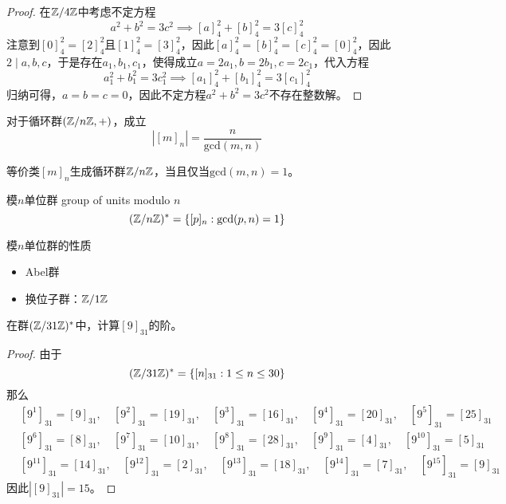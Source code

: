 \begin{proof}
	在$\mathbb{Z}/4\mathbb{Z}$中考虑不定方程
	$$
	a^2+b^2=3c^2\implies [a]^2_4+[b]^2_4=3[c]^2_4
	$$
	注意到$[0]_4^2=[2]^2_4$且$[1]_4^2=[3]^2_4$，因此$[a]_4^2=[b]_4^2=[c]_4^2=[0]_4^2$，因此$2\mid a,b,c$，于是存在$a_1,b_1,c_1$，使得成立$a=2a_1,b=2b_1,c=2c_1$，代入方程
	$$
	a_1^2+b_1^2=3c_1^2\implies [a_1]^2_4+[b_1]^2_4=3[c_1]^2_4
	$$
	归纳可得，$a=b=c=0$，因此不定方程$a^2+b^2=3c^2$不存在整数解。
\end{proof}

\begin{proposition}
	对于循环群$(\mathbb{Z}/n\mathbb{Z},+)$，成立
	$$
	|[m]_n|=\frac{n}{\mathrm{gcd}(m,n)}
	$$
\end{proposition}

\begin{corollary}
	等价类$[m]_n$生成循环群$\mathbb{Z}/n\mathbb{Z}$，当且仅当$\mathrm{gcd}(m,n)=1$。
\end{corollary}

\begin{definition}{模$n$单位群 group of units modulo $n$}
	$$
	(\mathbb{Z}/n\mathbb{Z})^*=\{ [p]_n:\mathrm{gcd}(p,n)=1 \}
	$$
\end{definition}

\begin{proposition}{模$n$单位群的性质}
	\begin{itemize}
		\item Abel群
		\item 换位子群：$\mathbb{Z}/1\mathbb{Z}$
	\end{itemize}
\end{proposition}

\begin{example}
	在群$(\mathbb{Z}/31\mathbb{Z})^*$中，计算$[9]_{31}$的阶。
\end{example}

\begin{proof}
	由于
	$$
	(\mathbb{Z}/31\mathbb{Z})^*=\{ [n]_{31}:1\le n\le30 \}
	$$
	那么
	\begin{align*}
		&[9^1]_{31}=[9]_{31},\quad
		[9^2]_{31}=[19]_{31},\quad
		[9^3]_{31}=[16]_{31},\quad
		[9^4]_{31}=[20]_{31},\quad
		[9^5]_{31}=[25]_{31}\\
		&[9^6]_{31}=[8]_{31},\quad
		[9^7]_{31}=[10]_{31},\quad
		[9^8]_{31}=[28]_{31},\quad
		[9^9]_{31}=[4]_{31},\quad
		[9^{10}]_{31}=[5]_{31}\\
		&[9^{11}]_{31}=[14]_{31},\quad
		[9^{12}]_{31}=[2]_{31},\quad
		[9^{13}]_{31}=[18]_{31},\quad
		[9^{14}]_{31}=[7]_{31},\quad
		[9^{15}]_{31}=[9]_{31}
	\end{align*}
	因此$|[9]_{31}|=15$。
\end{proof}

